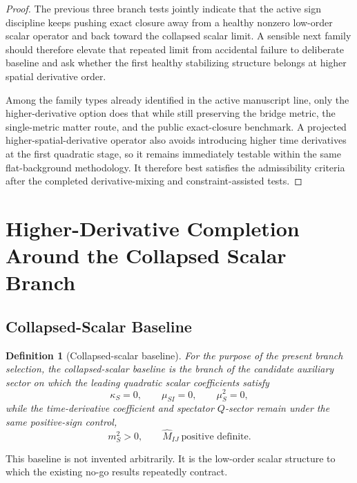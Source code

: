\documentclass[11pt]{article}
\newtheorem{definition}{Definition}
\begin{document}
\begin{proof}
The previous three branch tests jointly indicate that the active sign discipline keeps pushing exact closure away from a healthy nonzero low-order scalar operator and back toward the collapsed scalar limit. A sensible next family should therefore elevate that repeated limit from accidental failure to deliberate baseline and ask whether the first healthy stabilizing structure belongs at higher spatial derivative order.

Among the family types already identified in the active manuscript line, only the higher-derivative option does that while still preserving the bridge metric, the single-metric matter route, and the public exact-closure benchmark. A projected higher-spatial-derivative operator also avoids introducing higher time derivatives at the first quadratic stage, so it remains immediately testable within the same flat-background methodology. It therefore best satisfies the admissibility criteria after the completed derivative-mixing and constraint-assisted tests.
\end{proof}

\section{Higher-Derivative Completion Around the Collapsed Scalar Branch}

\subsection{Collapsed-Scalar Baseline}

\begin{definition}[Collapsed-scalar baseline]
For the purpose of the present branch selection, the collapsed-scalar baseline is the branch of the candidate auxiliary sector on which the leading quadratic scalar coefficients satisfy
\begin{equation}
\kappa_S=0,
\qquad
\mu_{SI}=0,
\qquad
\mu_S^2=0,
\label{eq:collapsedbaseline}
\end{equation}
while the time-derivative coefficient and spectator \(Q\)-sector remain under the same positive-sign control,
\begin{equation}
m_S^2>0,
\qquad
\widehat M_{IJ}\ \text{positive definite}.
\label{eq:baselinehealth}
\end{equation}
\end{definition}

This baseline is not invented arbitrarily. It is the low-order scalar structure to which the existing no-go results repeatedly contract.
\end{document}
